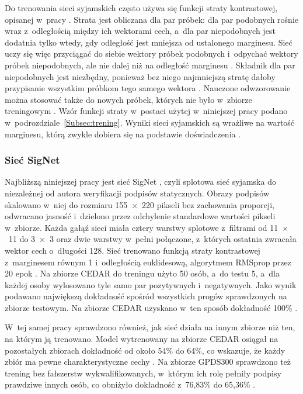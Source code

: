 \documentclass[12pt, twoside, openright]{article}
\begin{document}
Do trenowania sieci syjamskich często używa się funkcji straty kontrastowej, opisanej w~pracy \cite{hadsell2006}.
Strata jest obliczana dla par próbek: dla par podobnych rośnie wraz z~odległością między ich wektorami cech, a~dla par niepodobnych jest dodatnia tylko wtedy, gdy odległość jest mniejsza od ustalonego marginesu.
Sieć uczy się więc przyciągać do siebie wektory próbek podobnych i~odpychać wektory próbek niepodobnych, ale nie dalej niż na odległość marginesu \cite{hadsell2006}.
Składnik dla par niepodobnych jest niezbędny, ponieważ bez niego najmniejszą stratę dałoby przypisanie wszystkim próbkom tego samego wektora \cite{hadsell2006}.
Nauczone odwzorowanie można stosować także do nowych próbek, których nie było w~zbiorze treningowym \cite{hadsell2006}.
Wzór funkcji straty w~postaci użytej w~niniejszej pracy podano w~podrozdziale~\ref{Subsec:trening}.
Wyniki sieci syjamskich są wrażliwe na wartość marginesu, którą zwykle dobiera się na podstawie doświadczenia \cite{li2022}.

\subsubsection*{Sieć SigNet}

Najbliższą niniejszej pracy jest sieć SigNet \cite{dey2017}, czyli splotowa sieć syjamska do niezależnej od autora weryfikacji podpisów statycznych.
Obrazy podpisów skalowano w~niej do rozmiaru 155~$\times$~220 pikseli bez zachowania proporcji, odwracano jasność i~dzielono przez odchylenie standardowe wartości pikseli w~zbiorze.
Każda gałąź sieci miała cztery warstwy splotowe z~filtrami od 11~$\times$~11 do 3~$\times$~3 oraz dwie warstwy w~pełni połączone, z~których ostatnia zwracała wektor cech o~długości 128.
Sieć trenowano funkcją straty kontrastowej z~marginesem równym 1 i~odległością euklidesową, algorytmem RMSprop przez 20 epok \cite{dey2017}.
Na zbiorze CEDAR do treningu użyto 50 osób, a~do testu 5, a~dla każdej osoby wylosowano tyle samo par pozytywnych i~negatywnych.
Jako wynik podawano największą dokładność spośród wszystkich progów sprawdzonych na zbiorze testowym.
Na zbiorze CEDAR uzyskano w~ten sposób dokładność 100\% \cite{dey2017}.

W~tej samej pracy sprawdzono również, jak sieć działa na innym zbiorze niż ten, na którym ją trenowano.
Model wytrenowany na zbiorze CEDAR osiągał na pozostałych zbiorach dokładność od około 54\% do 64\%, co wskazuje, że każdy zbiór ma pewne charakterystyczne cechy \cite{dey2017}.
Na zbiorze GPDS300 sprawdzono też trening bez fałszerstw wykwalifikowanych, w~którym ich rolę pełniły podpisy prawdziwe innych osób, co obniżyło dokładność z~76,83\% do 65,36\% \cite{dey2017}.
\end{document}

